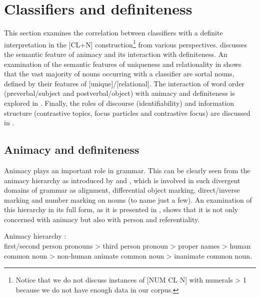 \documentclass[output=paper]{langsci/langscibook}
\begin{document}
\section{Classifiers and definiteness}\label{1sec:3}

This section examines the correlation between classifiers with a definite interpretation in the [CL+N] construction\footnote{Notice that we do not discuss instances of [NUM CL N] with numerals > 1 because we do not have enough data in our corpus.} from various perspectives.  discusses the semantic feature of animacy and its interaction with definiteness. An examination of the semantic features of uniqueness and relationality in  shows that the vast majority of nouns occurring with a classifier are sortal nouns, defined by their features of [\minus unique]/[\minus relational]. The interaction of word order (preverbal/subject and postverbal/object) with animacy and definiteness is explored in . Finally, the roles of discourse (identifiability) and information structure (contrastive topics, focus particles and contrastive focus) are discussed in .


\subsection{Animacy and definiteness}\label{1sec:31}

Animacy plays an important role in grammar. This can be clearly seen from the animacy hierarchy as introduced by \citet{silverstein:76} and \citet{dixon:79}, which is involved in such divergent domains of grammar as alignment, differential object marking, direct/inverse marking and number marking on nouns (to name just a few). An examination of this hierarchy in its full form, as it is presented in \citet[][130]{croft:03}, shows that it is not only concerned with animacy but also with person and referentiality.

\begin{exe}
\ex Animacy hierarchy \citep[][130]{croft:03}:\\
        first/second person pronouns > third person pronoun > proper names > human common
        noun > non-human animate common noun > inanimate common noun.
\end{exe}
\end{document}
